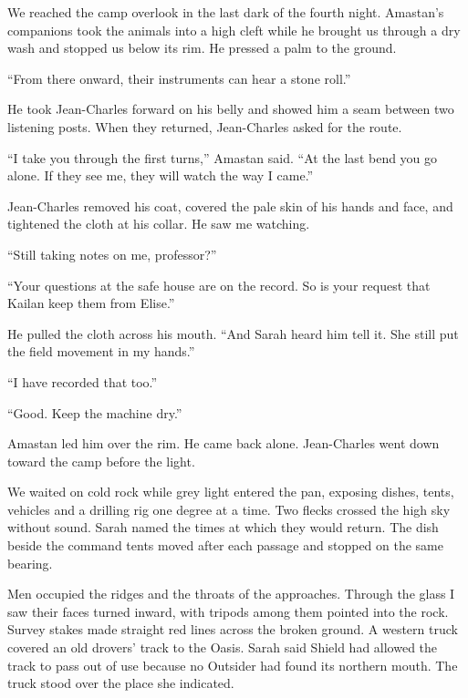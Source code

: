 \ornament

We reached the camp overlook in the last dark of the fourth night. Amastan's companions took the animals into a high cleft while he brought us through a dry wash and stopped us below its rim. He pressed a palm to the ground.\par

``From there onward, their instruments can hear a stone roll.''\par

He took Jean-Charles forward on his belly and showed him a seam between two listening posts. When they returned, Jean-Charles asked for the route.\par

``I take you through the first turns,'' Amastan said. ``At the last bend you go alone. If they see me, they will watch the way I came.''\par

Jean-Charles removed his coat, covered the pale skin of his hands and face, and tightened the cloth at his collar. He saw me watching.\par

``Still taking notes on me, professor?''\par

``Your questions at the safe house are on the record. So is your request that Kailan keep them from Elise.''\par

He pulled the cloth across his mouth. ``And Sarah heard him tell it. She still put the field movement in my hands.''\par

``I have recorded that too.''\par

``Good. Keep the machine dry.''\par

Amastan led him over the rim. He came back alone. Jean-Charles went down toward the camp before the light.\par

We waited on cold rock while grey light entered the pan, exposing dishes, tents, vehicles and a drilling rig one degree at a time. Two flecks crossed the high sky without sound. Sarah named the times at which they would return. The dish beside the command tents moved after each passage and stopped on the same bearing.\par

Men occupied the ridges and the throats of the approaches. Through the glass I saw their faces turned inward, with tripods among them pointed into the rock. Survey stakes made straight red lines across the broken ground. A western truck covered an old drovers' track to the Oasis. Sarah said Shield had allowed the track to pass out of use because no Outsider had found its northern mouth. The truck stood over the place she indicated.\par

